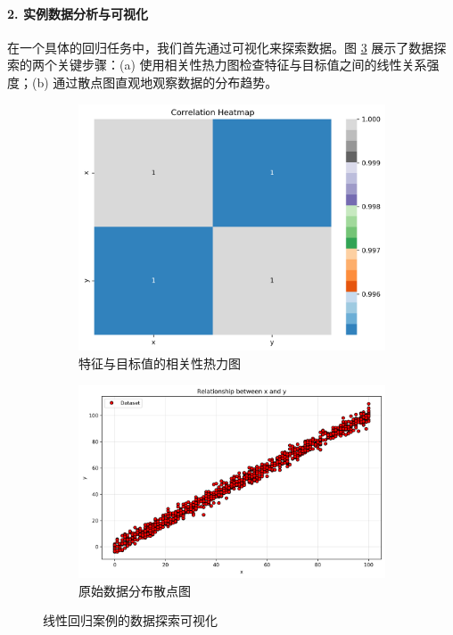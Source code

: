 \begin{itemize}
    \paragraph{2. 实例数据分析与可视化}
    在一个具体的回归任务中，我们首先通过可视化来探索数据。图 \ref{fig:lr_data_exploration} 展示了数据探索的两个关键步骤：(a) 使用相关性热力图检查特征与目标值之间的线性关系强度；(b) 通过散点图直观地观察数据的分布趋势。
    
    \begin{figure}[H]
        \centering
        \begin{subfigure}[b]{0.48\textwidth}
            \centering
            \includegraphics[width=\textwidth]{figures/correlation_heatmap.png}
            \caption{特征与目标值的相关性热力图}
            \label{fig:heatmap}
        \end{subfigure}
        \hfill
        \begin{subfigure}[b]{0.48\textwidth}
            \centering
            \includegraphics[width=\textwidth]{figures/data_scatter_plot.png}
            \caption{原始数据分布散点图}
            \label{fig:scatterplot}
        \end{subfigure}
        \caption{线性回归案例的数据探索可视化}
        \label{fig:lr_data_exploration}
    \end{figure}
    

\end{itemize}
